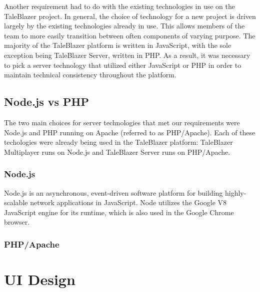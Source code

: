 Another requirement had to do with the existing technologies in use on the TaleBlazer project. In general, the choice of technology for a new project is driven largely by the existing technologies already in use. This allows members of the team to more easily transition between often components of varying purpose. The majority of the TaleBlazer platform is written in JavaScript, with the sole exception being TaleBlazer Server, written in PHP. As a result, it was necessary to pick a server technology that utilized either JavaScript or PHP in order to maintain technical consistency throughout the platform. 

\subsection{Node.js vs PHP}

The two main choices for server technologies that met our requirements were Node.js and PHP running on Apache (referred to as PHP/Apache). Each of these techologies were already being used in the TaleBlazer platform: TaleBlazer Multiplayer runs on Node.js and TaleBlazer Server runs on PHP/Apache. 

\subsubsection{Node.js}

Node.js is an asynchronous, event-driven software platform for building highly-scalable network applications in JavaScript. Node utilizes the Google V8 JavaScript engine for its runtime, which is also used in the Google Chrome browser. 

\subsubsection{PHP/Apache}


\section{UI Design}
